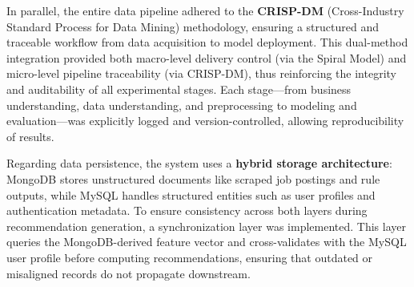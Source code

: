 \documentclass{svproc} %
\begin{document}
	In parallel, the entire data pipeline adhered to the \textbf{CRISP-DM} (Cross-Industry Standard Process for Data Mining) methodology, ensuring a structured and traceable workflow from data acquisition to model deployment. This dual-method integration provided both macro-level delivery control (via the Spiral Model) and micro-level pipeline traceability (via CRISP-DM), thus reinforcing the integrity and auditability of all experimental stages. Each stage—from business understanding, data understanding, and preprocessing to modeling and evaluation—was explicitly logged and version-controlled, allowing reproducibility of results.
	
	Regarding data persistence, the system uses a \textbf{hybrid storage architecture}: MongoDB stores unstructured documents like scraped job postings and rule outputs, while MySQL handles structured entities such as user profiles and authentication metadata. To ensure consistency across both layers during recommendation generation, a synchronization layer was implemented. This layer queries the MongoDB-derived feature vector and cross-validates with the MySQL user profile before computing recommendations, ensuring that outdated or misaligned records do not propagate downstream.
	
	
\end{document}
